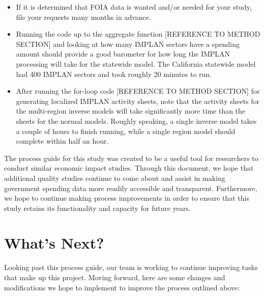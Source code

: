 \documentclass[
]{book}
\providecommand{\tightlist}{%
  \setlength{\itemsep}{0pt}\setlength{\parskip}{0pt}}
\begin{document}
\begin{itemize}
\tightlist
\item
  If it is determined that FOIA data is wanted and/or needed for your study, file your requests many months in advance.
\item
  Running the code up to the aggregate function {[}REFERENCE TO METHOD SECTION{]} and looking at how many IMPLAN sectors have a spending amount should provide a good barometer for how long the IMPLAN processing will take for the statewide model. The California statewide model had 400 IMPLAN sectors and took roughly 20 minutes to run.
\item
  After running the for-loop code {[}REFERENCE TO METHOD SECTION{]} for generating localized IMPLAN activity sheets, note that the activity sheets for the multi-region inverse models will take significantly more time than the sheets for the normal models. Roughly speaking, a single inverse model takes a couple of hours to finish running, while a single region model should complete within half an hour.
\end{itemize}

The process guide for this study was created to be a useful tool for researchers to conduct similar economic impact studies. Through this document, we hope that additional quality studies continue to come about and assist in making government spending data more readily accessible and transparent. Furthermore, we hope to continue making process improvements in order to ensure that this study retains its functionality and capacity for future years.

\hypertarget{next}{%
\chapter{What's Next?}\label{next}}

Looking past this process guide, our team is working to continue improving tasks that make up this project. Moving forward, here are some changes and modifications we hope to implement to improve the process outlined above:
\end{document}
